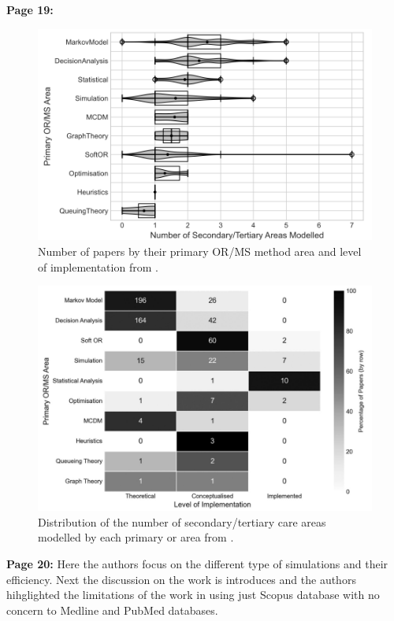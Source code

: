     \textbf{Page 19:}
    \begin{figure}[H]
        \centering
        \includegraphics[width=.9\textwidth]{figures/0005_SR02GB23/fig7.png}
        \caption{Number of papers by their primary OR/MS method area and level of implementation from \cite{x122}.}
        \label{fig7:SR02GB23}
    \end{figure}
    \begin{figure}[H]
        \centering
        \includegraphics[width=1\textwidth]{figures/0005_SR02GB23/fig8.png}
        \caption{Distribution of the number of secondary/tertiary care areas modelled by each primary or area from \cite{x122}.}
        \label{fig8:SR02GB23}
    \end{figure}

    \textbf{Page 20:}
    Here the authors focus on the different type of simulations and their efficiency. Next the discussion on the work is introduces and the authors hihglighted the limitations of the work in using just Scopus database with no concern to Medline and PubMed databases.

